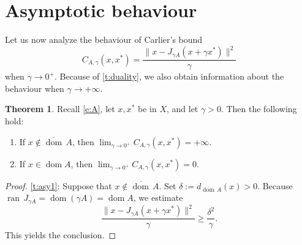 \documentclass[12pt]{article}
\newcommand{\dom}{\ensuremath{\operatorname{dom}}}
\newcommand{\ran}{\ensuremath{{\operatorname{ran}}\,}}
\newcommand{\cdom}{\ensuremath{\overline{\operatorname{dom}}\,}}
\newcommand{\pinf}{\ensuremath{+\infty}}
\theoremstyle{definition}
\newtheorem{theorem}{Theorem}[section]
\providecommand{\ran}{\operatorname{ran}}
\providecommand{\dom}{\operatorname{dom}}
\providecommand{\ran}{\operatorname{ran}}
\begin{document}
{\section{Asymptotic behaviour}

\label{sec:asymp}

Let us now analyze the behaviour of Carlier's bound
\begin{equation}
C_{A,\gamma}(x,x^*) = \frac{\|x-J_{\gamma A}(x+\gamma x^*)\|^2}{\gamma}
\end{equation}
when $\gamma\to 0^+$. Because of \cref{t:duality}, we also obtain information about the behaviour 
when $\gamma\to\pinf$.


\begin{theorem}
\label{t:asy}
Recall \cref{e:A}, let $x,x^*$ be in $X$, and let $\gamma>0$. 
Then the following hold: 
\begin{enumerate}
\item 
\label{t:asy1}
If $x\notin\cdom A$, then $\lim_{\gamma\to 0^+} C_{A,\gamma}(x,x^*)
= \pinf$.
\item 
\label{t:asy2}
If $x\in\dom A$, then $\lim_{\gamma\to 0^+} C_{A,\gamma}(x,x^*)=0$. 
\end{enumerate}
\end{theorem}
\begin{proof}
\cref{t:asy1}: Suppose that $x\notin\cdom A$. 
Set $\delta := d_{\cdom A}(x)>0$. 
Because $\ran J_{\gamma A} = \dom(\gamma A) = \dom A$, we estimate 
\begin{equation}
\frac{\|x-J_{\gamma A}(x+\gamma x^*)\|^2}{\gamma}
\geq \frac{\delta^2}{\gamma}.
\end{equation}
This yields the conclusion. 


\end{proof}}
\end{document}
